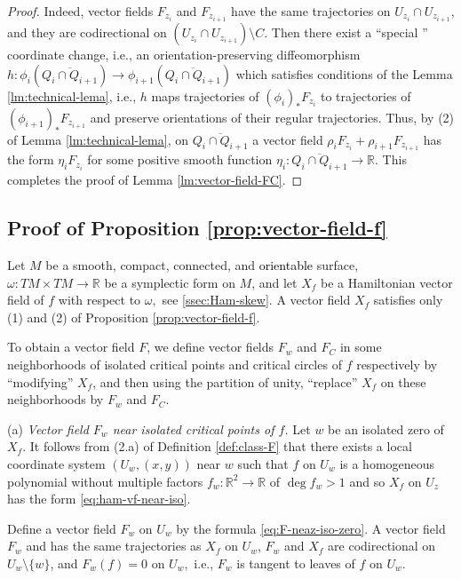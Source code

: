 \documentclass[10pt,reqno]{amsart}
\newcommand{\bbR}{\mathbb{R}}
\newcommand{\textr}[1]{\textcolor{black}{#1}}
\begin{document}
\begin{proof}
{Indeed,  vector fields $F_{z_i}$ and $F_{z_{i+1}}$ have the same trajectories on $U_{z_i}\cap U_{z_{i+1}}$, and they are codirectional on $(U_{z_i}\cap U_{z_{i+1}})\setminus C$. Then there exist a ``special '' coordinate change, i.e., an orientation-preserving diffeomorphism 
$h:\phi_i(\overline{Q_i\cap Q_{i+1}})\to \phi_{i+1}(\overline{Q_i\cap Q_{i+1}})$ which satisfies conditions of the Lemma \ref{lm:technical-lema}, i.e., $h$ maps  trajectories of $(\phi_i)_*F_{z_i}$ to  trajectories of $(\phi_{i+1})_*F_{z_{i+1}}$ and preserve orientations of their regular trajectories. Thus, by (2) of Lemma \ref{lm:technical-lema}, on $\overline{Q_i\cap Q_{i+1}}$ a vector field
$\rho_iF_{z_i}+\rho_{i+1} F_{z_{i+1}}$ has the form $\eta_{i} F_{z_{i}}$ for some positive smooth function $\eta_{i}:\overline{Q_i\cap Q_{i+1}}\to \bbR$. This completes the proof of  Lemma \ref{lm:vector-field-FC}.}
\end{proof}


\subsection{Proof of Proposition \ref{prop:vector-field-f}}
Let $M$ be a smooth,  compact, connected, and \textr{orientable} surface, $\omega:TM\times TM\to\bbR$ be  a symplectic form on $M$, and let $X_f$  be a Hamiltonian vector field of $f$ with respect to $\omega,$ see \textsection\ref{ssec:Ham-skew}. A vector field $X_f$ satisfies  only (1) and (2) of Proposition \ref{prop:vector-field-f}. 

To obtain a vector field $F$, 
we define vector fields $F_w$  and $F_C$  in some neighborhoods of isolated critical points and critical circles of $f$ respectively by ``modifying'' $X_f$, and then using the partition of unity, ``replace'' $X_f$ on these neighborhoods by $F_w$ and $F_C$.

(a) {\it Vector field $F_w$ near isolated critical points of $f$.} Let $w$ be an isolated zero of $X_f$.  It follows from (2.a) of Definition \ref{def:class-F} that there exists a local coordinate system $(U_w, (x,y))$ near $w$ such that $f$ on $U_w$ is a homogeneous polynomial without multiple factors $f_w:\bbR^2\to \bbR$ of $\deg f_w> 1$ and so 
$X_f$ on $U_z$ has the form \eqref{eq:ham-vf-near-iso}.


Define a vector field $F_w$ on $U_w$ by the formula \eqref{eq:F-neaz-iso-zero}. 
A vector field $F_w$ and has the same trajectories as $X_f$ on $U_w$, $F_w$ and $X_f$ are codirectional on $U_w\setminus \{w\}$, and $F_w(f) = 0$ on $U_w,$ i.e., $F_w$ is tangent to leaves of $f$ on $U_w$. 
\end{document}
